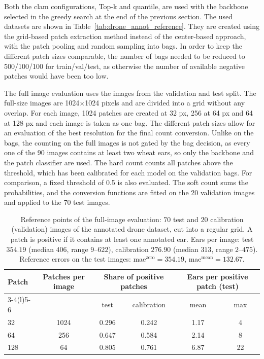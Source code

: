 \documentclass[12pt,parskip = half, DIV=classic,listof=totoc]{scrartcl}
\begin{document}
		Both the \ac{clam} configurations, Top-k and quantile, are used with the backbone selected in the greedy search at the end 
		of the previous section. The used datasets are shown in Table~\ref{tab:drone_annot_reference}. They are created using the 
		grid-based patch extraction method instead of the center-based approach, with the patch pooling and random sampling into bags. 
		In order to keep the different patch sizes comparable, the number of 
		bags needed to be reduced to 500/100/100 for train/val/test, as otherwise the number of available negative patches would have been too low.

		The full image evaluation uses the images from the validation and test split. 
		The full-size images are 1024$\times$1024 pixels and are divided into a grid
		without any overlap. For each image, 1024 patches are created at 32 px, 256 at 64 px and 64 at 128 px and each image is taken as one bag.
		The different patch sizes allow for an evaluation of the best resolution for the final count conversion.
		Unlike on the bags, the counting on the full images is not gated by the bag decision, 
		as every one of the 90 images contains at least two wheat ears, so only the backbone and 
		the patch classifier are used. The hard count counts all patches above the threshold, which has been calibrated for each model on the
		validation bags. For comparison, a fixed threshold of 0.5 is also evaluated. 
		The soft count sums the probabilities, and the conversion functions are fitted on the 20 
		validation images and applied to the 70 test images.
		
		\begin{table}[htbp]
			\centering
			\footnotesize
			\begin{tabular}{@{}lccccc@{}}
				\toprule
				\multirow{2}{*}{Patch} & \multirow{2}{*}{Patches per image} & \multicolumn{2}{c}{Share of positive patches} &
					\multicolumn{2}{c}{Ears per positive patch (test)} \\
				\cmidrule(lr){3-4}\cmidrule(l){5-6}
				& & test & calibration & mean & max \\
				\midrule
				32  & 1024 & 0.296 & 0.242 & 1.17 & 4 \\
				64  & 256  & 0.647 & 0.584 & 2.14 & 8 \\
				128 & 64   & 0.805 & 0.761 & 6.87 & 22 \\
				\bottomrule
			\end{tabular}
			\caption[Reference points of the full-image evaluation: $70$ test and $20$ calibration (validation) images of the annotated drone dataset, cut into a regular grid]{Reference points of the full-image evaluation: $70$ test and $20$ calibration (validation) images of
			the annotated drone dataset, cut into a regular grid. A patch is positive if it contains at least one
			annotated ear. Ears per image: test $354.19$ (median $406$, range $9$--$622$), calibration $276.90$
			(median $313$, range $2$--$475$). Reference errors on the test images: \acs*{mae}$^{\text{zero}} = 354.19$,
			\acs*{mae}$^{\text{mean}} = 132.67$.}
			\label{tab:drone_fullimage_reference}
		\end{table}
\end{document}
